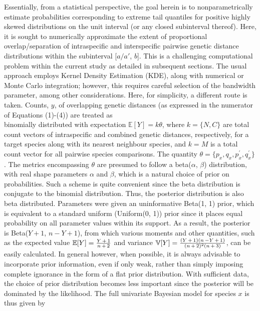 \documentclass[12pt]{article}
\begin{document}
Essentially, from a statistical perspective, the goal herein is to nonparametrically estimate probabilities corresponding to extreme tail quantiles for positive highly skewed distributions on the unit interval  (or any closed subinterval thereof). Here, it is sought to numerically approximate the extent of proportional overlap/separation of intraspecific and interspecific pairwise genetic distance distributions within the subinterval [$a/a'$, $b$]. This is a challenging computational problem within the current study as detailed in subsequent sections. The usual approach employs Kernel Density Estimation (KDE), along with numerical or Monte Carlo integration; however, this requires careful selection of the bandwidth parameter, among other considerations. Here, for simplicity, a different route is taken. Counts, $y$, of overlapping genetic distances (as expressed in the numerator of Equations (1)-(4)) are treated as \\ binomially distributed with expectation $\mathbb{E}[Y] = k\theta$, where $k = \{N, C\}$ are total count vectors of intraspecific and combined genetic distances, respectively, for a target species along with its nearest neighbour species, and $k = M$ is a total count vector for all pairwise species comparisons. The quantity $\theta = \{p_x, q_x, p^{'}_x, q^{'}_x\}$. The metrics encompassing $\theta$ are presumed to follow a beta($\alpha$, $\beta$) distribution, with real shape parameters $\alpha$ and $\beta$, which is a natural choice of prior on probabilities. Such a scheme is quite convenient since the beta distribution is conjugate to the binomial distribution. Thus, the posterior distribution is also beta distributed. Parameters were given an uninformative Beta(1, 1) prior, which is equivalent to a standard uniform (Uniform(0, 1)) prior since it places equal probability on all parameter values within its support. As a result, the posterior is Beta($Y + 1$, $n - Y + 1$), from which various moments and other quantities, such as the expected value $\mathbb{E}[Y] = \frac{Y \hspace{0.5mm} + \hspace{0.5mm} 1}{n \hspace{0.5mm} + \hspace{0.5mm} 2}$ and variance $\mathbb{V}[Y] = \frac{(Y \hspace{0.5mm} + \hspace{0.5mm} 1)(n \hspace{0.5mm} - Y \hspace{0.5mm} + \hspace{0.5mm} 1)}{(n \hspace{0.5mm} + \hspace{0.5mm} 2)^2(n \hspace{0.5mm} + \hspace{0.5mm} 3)}$, can be easily calculated. In general however, when possible, it is always advisable to incorporate prior information, even if only weak, rather than simply imposing complete ignorance in the form of a flat prior distribution. With sufficient data, the choice of prior distribution becomes less important since the posterior will be dominated by the likelihood.  The full univariate Bayesian model for species $x$ is thus given by
\end{document}
